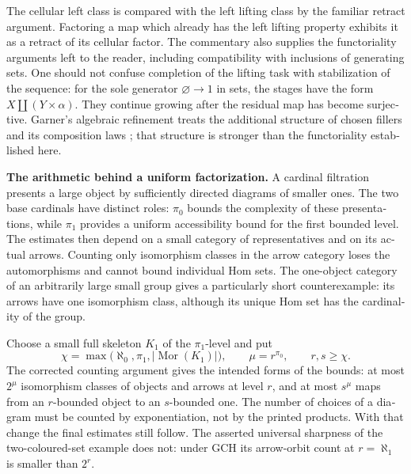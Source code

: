 \begin{otherlanguage}{english}
The cellular left class is compared with the left lifting class by the familiar retract argument. Factoring a map which already has the left lifting property exhibits it as a retract of its cellular factor. The commentary also supplies the functoriality arguments left to the reader, including compatibility with inclusions of generating sets. One should not confuse completion of the lifting task with stabilization of the sequence: for the sole generator $\varnothing\to1$ in sets, the stages have the form $X\amalg(Y\times\alpha)$. They continue growing after the residual map has become surjective. Garner's algebraic refinement treats the additional structure of chosen fillers and its composition laws \citep{Garner2009}; that structure is stronger than the functoriality established here.

\medskip\noindent\textbf{The arithmetic behind a uniform factorization.}
A cardinal filtration presents a large object by sufficiently directed diagrams of smaller ones. The two base cardinals have distinct roles: $\pi_0$ bounds the complexity of these presentations, while $\pi_1$ provides a uniform accessibility bound for the first bounded level. The estimates then depend on a small category of representatives and on its actual arrows. Counting only isomorphism classes in the arrow category loses the automorphisms and cannot bound individual Hom sets. The one-object category of an arbitrarily large small group gives a particularly short counterexample: its arrows have one isomorphism class, although its unique Hom set has the cardinality of the group.

Choose a small full skeleton $K_1$ of the $\pi_1$-level and put
\[
 \chi=\max\bigl(\aleph_0,\pi_1,|\operatorname{Mor}(K_1)|\bigr),
 \qquad \mu=r^{\pi_0},\qquad r,s\geq\chi.
\]
The corrected counting argument gives the intended forms of the bounds: at most $2^\mu$ isomorphism classes of objects and arrows at level $r$, and at most $s^\mu$ maps from an $r$-bounded object to an $s$-bounded one. The number of choices of a diagram must be counted by exponentiation, not by the printed products. With that change the final estimates still follow. The asserted universal sharpness of the two-coloured-set example does not: under GCH its arrow-orbit count at $r=\aleph_1$ is smaller than $2^r$.


\end{otherlanguage}
